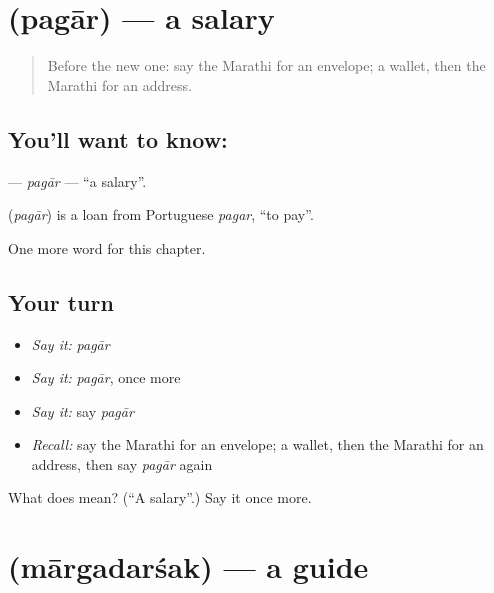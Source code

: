 \section[\texorpdfstring{\mr{पगार} (pagār)}{पगार (pagār)}]{ (pagār) — a salary}

\label{lesson:MR-C212-pagar}



\begin{quote}
Before the new one: say the Marathi for an envelope; a wallet, then the Marathi for an address.
\end{quote}

\subsection*{You'll want to know: }
\textbf{} — \emph{pagār} — \textquotedblleft{}a salary\textquotedblright{}.

\begin{cousinweb}
\textbf{} (\emph{pagār}) is a loan from Portuguese \emph{pagar}, \textquotedblleft{}to pay\textquotedblright{}.
\end{cousinweb}

\begin{grammarlens}[title={What you've built}]
One more word for this chapter.
\end{grammarlens}

\subsection*{Your turn}
\begin{itemize}
\raggedright
  \item \emph{Say it:} \emph{pagār}
  \item \emph{Say it:} \emph{pagār}, once more
  \item \emph{Say it:} say \emph{pagār}
  \item \emph{Recall:} say the Marathi for an envelope; a wallet, then the Marathi for an address, then say \emph{pagār} again
\end{itemize}

\begin{tcolorbox}[breakable,colback=teal!4,colframe=teal!35!black,title={Before you move on}]
What does  mean? (\textquotedblleft{}A salary\textquotedblright{}.) Say it once more.
\end{tcolorbox}
\section[\texorpdfstring{\mr{मार्गदर्शक} (mārgadarśak)}{मार्गदर्शक (mārgadarśak)}]{ (mārgadarśak) — a guide}

